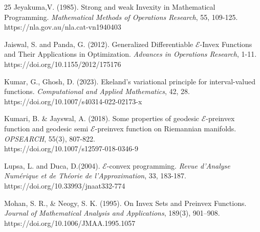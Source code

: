 \documentclass[12pt, reqno]{amsart}
\theoremstyle{definition}
\theoremstyle{remark}
\numberwithin{equation}{section}
\begin{document}
\begin{thebibliography}{25}
  Jeyakuma,V. (1985). Strong and weak Invexity in Mathematical Programming. \textit{Mathematical Methods of Operations Research}, 55, 109-125.\\
 https://nla.gov.au/nla.cat-vn1940403
       	
  Jaiswal, S. and Panda, G. (2012). Generalized Differentiable $\mathcal{E}$-Invex Functions and Their Applications in Optimization. \textit{Advances in Operations Research}, 1-11.\\
https://doi.org/10.1155/2012/175176
       	
       	
Kumar, G., Ghosh, D. (2023). Ekeland’s variational principle for interval-valued functions. \textit{Computational and Applied Mathematics}, 42, 28. \\
https://doi.org/10.1007/s40314-022-02173-x
        
  Kumari, B. \& Jayswal, A. (2018).
Some properties of geodesic $\mathcal{E}$-preinvex function and geodesic semi $\mathcal{E}$-preinvex function on Riemannian manifolds. \textit{OPSEARCH}, 55(3), 807-822.\\
https://doi.org/10.1007/s12597-018-0346-9
      
 Lupsa, L. and  Duca, D.(2004).  $\mathcal{E}$-convex programming. \textit{Revue d'Analyse Numérique et de Théorie de l'Approximation}, {33}, 183-187.\\
https://doi.org/10.33993/jnaat332-774

       	
 Mohan, S. R., \& Neogy, S. K. (1995). On Invex Sets and Preinvex Functions. \textit{Journal of Mathematical Analysis and Applications}, 189(3), 901–908.\\
https://doi.org/10.1006/JMAA.1995.1057
    	

\end{thebibliography}
\end{document}
